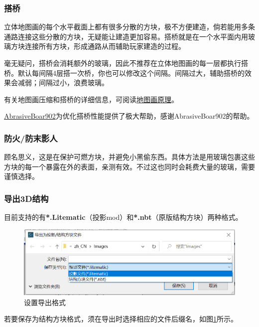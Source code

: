 \documentclass[UTF8]{ctexart}
\begin{document}
\subsubsection{搭桥}
立体地图画的每个水平截面上都有很多分散的方块，极不方便建造，倘若能用多条通路连接这些分散的方块，无疑能让建造更加容易。搭桥就是在一个水平面内用玻璃方块连接所有方块，形成通路从而辅助玩家建造的过程。

毫无疑问，搭桥会消耗额外的玻璃，因此不推荐在立体地图画的每一层都执行搭桥。默认每间隔4层搭一次桥，你也可以修改这个间隔。间隔过大，辅助搭桥的效果会减弱；间隔过小，浪费玻璃。

有关地图画压缩和搭桥的详细信息，可阅读\href{https://github.com/ToKiNoBug/SlopeCraftTutorial/blob/main/BasicPrinciple/Principle%20of%20map%20pixel%20arts.md}{地图画原理}。

\href{https://github.com/AbrasiveBoar902}{AbrasiveBoar902}为优化搭桥性能提供了极大帮助，感谢AbrasiveBoar902的帮助。

\subsubsection{防火/防末影人}
顾名思义，这是在保护可燃方块，并避免小黑偷东西。具体方法是用玻璃包裹这些方块的每一个暴露在外的表面，亲测有效。不过这也同时会耗费大量的玻璃，需要谨慎选择。

\subsubsection{导出3D结构}
目前支持的有\textbf{*.Litematic}（投影mod）和\textbf{*.nbt}（原版结构方块）两种格式。

\begin{figure}[htbp]
    \centering
    \includegraphics[width=15cm]{Img7_SelectFormat.png}
    \caption{设置导出格式}
    \label{setExport3DFormat}
\end{figure}

若要保存为结构方块格式，须在导出时选择相应的文件后缀名，如图\ref*{setExport3DFormat}所示。
\end{document}
